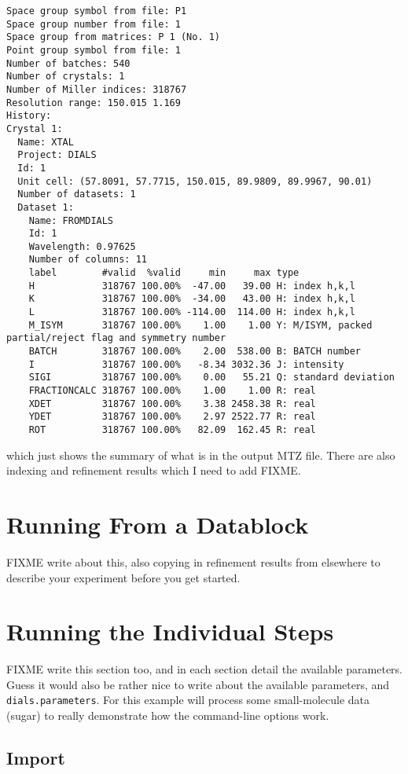 \documentclass[a4paper, 11pt]{article}
\begin{document}
{\small
\begin{verbatim}
Space group symbol from file: P1
Space group number from file: 1
Space group from matrices: P 1 (No. 1)
Point group symbol from file: 1
Number of batches: 540
Number of crystals: 1
Number of Miller indices: 318767
Resolution range: 150.015 1.169
History:
Crystal 1:
  Name: XTAL
  Project: DIALS
  Id: 1
  Unit cell: (57.8091, 57.7715, 150.015, 89.9809, 89.9967, 90.01)
  Number of datasets: 1
  Dataset 1:
    Name: FROMDIALS
    Id: 1
    Wavelength: 0.97625
    Number of columns: 11
    label        #valid  %valid     min     max type
    H            318767 100.00%  -47.00   39.00 H: index h,k,l
    K            318767 100.00%  -34.00   43.00 H: index h,k,l
    L            318767 100.00% -114.00  114.00 H: index h,k,l
    M_ISYM       318767 100.00%    1.00    1.00 Y: M/ISYM, packed partial/reject flag and symmetry number
    BATCH        318767 100.00%    2.00  538.00 B: BATCH number
    I            318767 100.00%   -8.34 3032.36 J: intensity
    SIGI         318767 100.00%    0.00   55.21 Q: standard deviation
    FRACTIONCALC 318767 100.00%    1.00    1.00 R: real
    XDET         318767 100.00%    3.38 2458.38 R: real
    YDET         318767 100.00%    2.97 2522.77 R: real
    ROT          318767 100.00%   82.09  162.45 R: real
\end{verbatim}
}

\noindent
which just shows the summary of what is in the output MTZ file. There are also indexing and refinement results which I need to add FIXME.

\section{Running From a Datablock}

FIXME write about this, also copying in refinement results from
elsewhere to describe your experiment before you get started.

\section{Running the Individual Steps}

FIXME write this section too, and in each section detail the available
parameters. Guess it would also be rather nice to write about the
available parameters, and \verb|dials.parameters|. For this example
will process some small-molecule data (sugar) to really demonstrate
how the command-line options work.

\subsection{Import}
\end{document}
